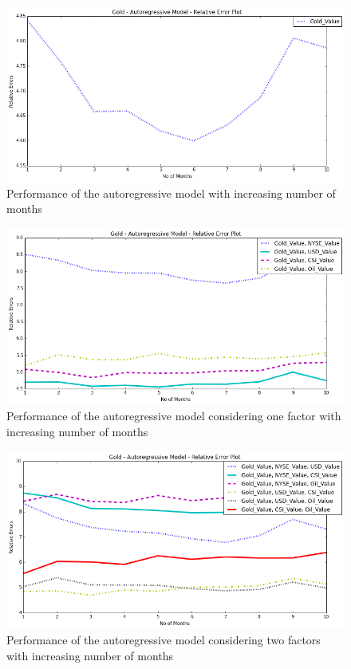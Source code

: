 \documentclass[runningheads]{llncs}
\begin{document}
\begin{figure}
\centering
\includegraphics[width=\textwidth]{gold_autoregressive.png}
\caption{Performance of the autoregressive model with increasing number of months}
\label{fig:gold_autoregressive.png}
\end{figure}

\begin{figure}
\centering
\includegraphics[width=\textwidth]{gold_autoregressive_1factor_10.png}
\caption{Performance of the autoregressive model considering one factor with increasing number of months}
\label{fig:gold_autoregressive_1factor_10.png}
\end{figure}

\begin{figure}
\centering
\includegraphics[width=\textwidth]{gold_autoregressive_2factors_10.png}
\caption{Performance of the autoregressive model considering two factors with increasing number of months}
\label{fig:gold_autoregressive_2factors_10.png}
\end{figure}
\end{document}

